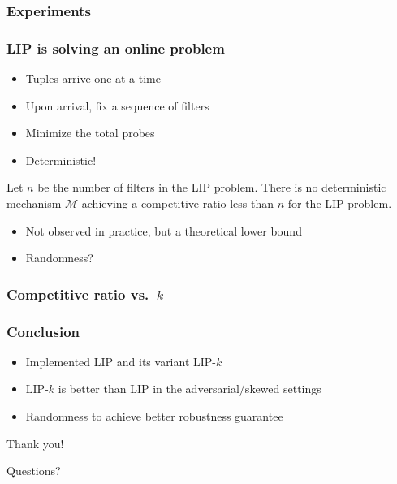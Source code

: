 \documentclass{beamer}
\begin{document}
\begin{frame}
  \frametitle{Experiments}
  \begin{figure}
    \centering
  \end{figure}
\end{frame}



\begin{frame}
\frametitle{LIP is solving an online problem}
\pause
\begin{itemize}
  \item Tuples arrive one at a time
  \item Upon arrival, fix a sequence of filters
  \item Minimize the total probes \pause
  \item Deterministic! \pause
\end{itemize}

\begin{theorem}
  Let $n$ be the number of filters in the LIP problem. There is no deterministic mechanism $\mathcal{M}$ achieving a competitive ratio less than $n$ for the \textsc{LIP} problem.
\end{theorem}

\pause
\begin{itemize}
  \item Not observed in practice, but a theoretical lower bound
  \item Randomness?
\end{itemize}

\end{frame}

\begin{frame}
  \frametitle{Competitive ratio vs.\ $k$}
  \begin{figure}
    \centering
  \end{figure}
\end{frame}



\begin{frame}
\frametitle{Conclusion}

  \begin{itemize}
    \item Implemented LIP and its variant LIP-$k$
    \item LIP-$k$ is better than LIP in the adversarial/skewed settings
    \item Randomness to achieve better robustness guarantee
  \end{itemize}
\end{frame}


\begin{frame}
\Huge{Thank you!}
\end{frame}

\begin{frame}
\Huge{Questions?}
\end{frame}
\end{document}
